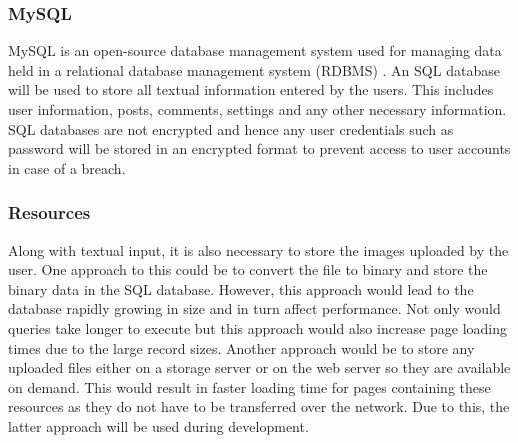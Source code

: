 \subsubsection{MySQL} 
MySQL is an open-source database management system used for managing data held in a relational database management system (RDBMS) \cite{MySQL:Home}. An SQL database will be used to store all textual information entered by the users. This includes user information, posts, comments, settings and any other necessary information. SQL databases are not encrypted and hence any user credentials such as password will be stored in an encrypted format to prevent access to user accounts in case of a breach.

\subsubsection{Resources}
Along with textual input, it is also necessary to store the images uploaded by the user. One approach to this could be to convert the file to binary and store the binary data in the SQL database. However, this approach would lead to the database rapidly growing in size and in turn affect performance. Not only would queries take longer to execute but this approach would also increase page loading times due to the large record sizes. Another approach would be to store any uploaded files either on a storage server or on the web server so they are available on demand. This would result in faster loading time for pages containing these resources as they do not have to be transferred over the network. Due to this, the latter approach will be used during development.